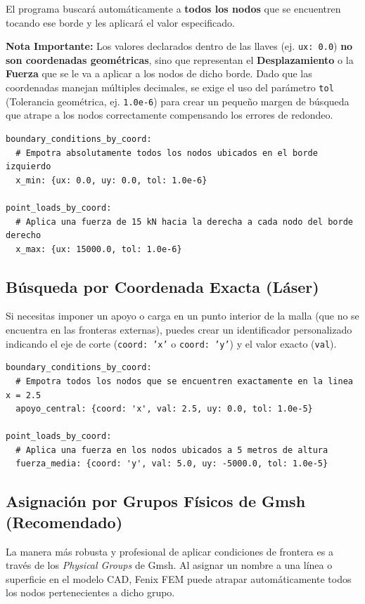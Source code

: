 \documentclass[12pt,a4paper]{article}
\begin{document}
El programa buscará automáticamente a \textbf{todos los nodos} que se encuentren tocando ese borde y les aplicará el valor especificado. 

\textbf{Nota Importante:} Los valores declarados dentro de las llaves (ej. \texttt{ux: 0.0}) \textbf{no son coordenadas geométricas}, sino que representan el \textbf{Desplazamiento} o la \textbf{Fuerza} que se le va a aplicar a los nodos de dicho borde. Dado que las coordenadas manejan múltiples decimales, se exige el uso del parámetro \texttt{tol} (Tolerancia geométrica, ej. \texttt{1.0e-6}) para crear un pequeño margen de búsqueda que atrape a los nodos correctamente compensando los errores de redondeo.

\begin{lstlisting}
boundary_conditions_by_coord:
  # Empotra absolutamente todos los nodos ubicados en el borde izquierdo
  x_min: {ux: 0.0, uy: 0.0, tol: 1.0e-6}

point_loads_by_coord:
  # Aplica una fuerza de 15 kN hacia la derecha a cada nodo del borde derecho
  x_max: {ux: 15000.0, tol: 1.0e-6}
\end{lstlisting}

\subsection{Búsqueda por Coordenada Exacta (Láser)}
Si necesitas imponer un apoyo o carga en un punto interior de la malla (que no se encuentra en las fronteras externas), puedes crear un identificador personalizado indicando el eje de corte (\texttt{coord: 'x'} o \texttt{coord: 'y'}) y el valor exacto (\texttt{val}).
\begin{lstlisting}
boundary_conditions_by_coord:
  # Empotra todos los nodos que se encuentren exactamente en la linea x = 2.5
  apoyo_central: {coord: 'x', val: 2.5, uy: 0.0, tol: 1.0e-5}

point_loads_by_coord:
  # Aplica una fuerza en los nodos ubicados a 5 metros de altura
  fuerza_media: {coord: 'y', val: 5.0, uy: -5000.0, tol: 1.0e-5}
\end{lstlisting}

\subsection{Asignación por Grupos Físicos de Gmsh (Recomendado)}
La manera más robusta y profesional de aplicar condiciones de frontera es a través de los \textit{Physical Groups} de Gmsh. Al asignar un nombre a una línea o superficie en el modelo CAD, Fenix FEM puede atrapar automáticamente todos los nodos pertenecientes a dicho grupo.
\end{document}
